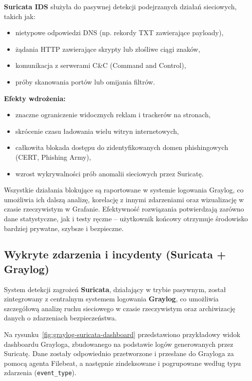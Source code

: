 \documentclass[
    left=2.5cm,         %
    right=2.5cm,        %
    top=2.5cm,          %
    bottom=3cm,         %
    bindingoffset=6mm,  %
    nohyphenation=true %
]{eiti/eiti-thesis} %
\begin{document}
\textbf{Suricata IDS} służyła do pasywnej detekcji podejrzanych działań sieciowych, takich jak:
\begin{itemize}
    \item nietypowe odpowiedzi DNS (np. rekordy TXT zawierające payloady),
    \item żądania HTTP zawierające skrypty lub złośliwe ciągi znaków,
    \item komunikacja z serwerami C\&C (Command and Control),
    \item próby skanowania portów lub omijania filtrów.
\end{itemize}

\textbf{Efekty wdrożenia:}
\begin{itemize}
    \item znaczne ograniczenie widocznych reklam i trackerów na stronach,
    \item skrócenie czasu ładowania wielu witryn internetowych,
    \item całkowita blokada dostępu do zidentyfikowanych domen phishingowych (CERT, Phishing Army),
    \item wzrost wykrywalności prób anomalii sieciowych przez Suricatę.
\end{itemize}

Wszystkie działania blokujące są raportowane w systemie logowania Graylog, co umożliwia ich dalszą analizę, korelację z innymi zdarzeniami oraz wizualizację w czasie rzeczywistym w Grafanie. Efektywność rozwiązania potwierdzają zarówno dane statystyczne, jak i testy ręczne – użytkownik końcowy otrzymuje środowisko bardziej prywatne, szybsze i bezpieczne.

\subsection{Wykryte zdarzenia i incydenty (Suricata + Graylog)}

System detekcji zagrożeń \textbf{Suricata}, działający w trybie pasywnym, został zintegrowany z centralnym systemem logowania \textbf{Graylog}, co umożliwia szczegółową analizę ruchu sieciowego w czasie rzeczywistym oraz archiwizację danych o zdarzeniach bezpieczeństwa.

Na rysunku~\ref{fig:graylog-suricata-dashboard} przedstawiono przykładowy widok dashboardu Grayloga, zbudowanego na podstawie logów generowanych przez Suricatę. Dane zostały odpowiednio przetworzone i przesłane do Grayloga za pomocą agenta Filebeat, a następnie zindeksowane i pogrupowane według typu zdarzenia (\texttt{event\_type}).
\end{document}
